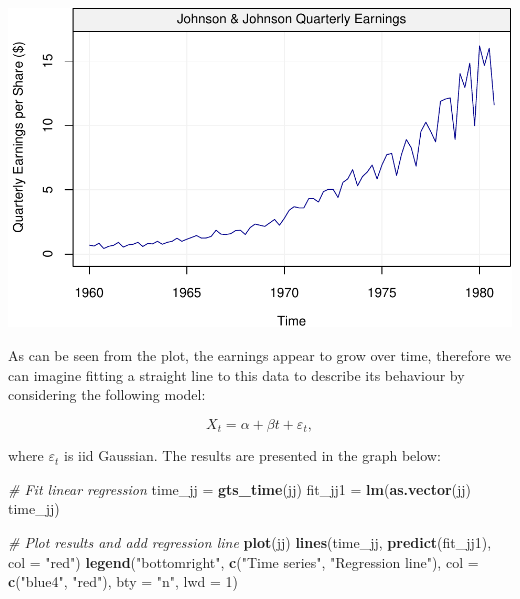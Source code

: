 \documentclass[]{book}
\newenvironment{Shaded}{\begin{snugshade}}{\end{snugshade}}
\newcommand{\KeywordTok}[1]{\textcolor[rgb]{0.13,0.29,0.53}{\textbf{#1}}}
\newcommand{\DataTypeTok}[1]{\textcolor[rgb]{0.13,0.29,0.53}{#1}}
\newcommand{\DecValTok}[1]{\textcolor[rgb]{0.00,0.00,0.81}{#1}}
\newcommand{\StringTok}[1]{\textcolor[rgb]{0.31,0.60,0.02}{#1}}
\newcommand{\CommentTok}[1]{\textcolor[rgb]{0.56,0.35,0.01}{\textit{#1}}}
\newcommand{\OperatorTok}[1]{\textcolor[rgb]{0.81,0.36,0.00}{\textbf{#1}}}
\newcommand{\NormalTok}[1]{#1}
\theoremstyle{definition}
\theoremstyle{definition}
\theoremstyle{definition}
\theoremstyle{remark}
\begin{document}
\begin{center}\includegraphics{ts_files/figure-latex/jjexample-1} \end{center}

As can be seen from the plot, the earnings appear to grow over time,
therefore we can imagine fitting a straight line to this data to
describe its behaviour by considering the following model:

\begin{equation} 
X_t = \alpha + \beta t + \varepsilon_t,
\label{eq:modeljjexample}
\end{equation}

where \(\varepsilon_t\) is iid Gaussian. The results are presented in
the graph below:

\begin{Shaded}
\begin{Highlighting}[]
\CommentTok{# Fit linear regression}
\NormalTok{time_jj =}\StringTok{ }\KeywordTok{gts_time}\NormalTok{(jj)}
\NormalTok{fit_jj1 =}\StringTok{ }\KeywordTok{lm}\NormalTok{(}\KeywordTok{as.vector}\NormalTok{(jj) }\OperatorTok{~}\StringTok{ }\NormalTok{time_jj)}

\CommentTok{# Plot results and add regression line}
\KeywordTok{plot}\NormalTok{(jj)}
\KeywordTok{lines}\NormalTok{(time_jj, }\KeywordTok{predict}\NormalTok{(fit_jj1), }\DataTypeTok{col =} \StringTok{"red"}\NormalTok{)}
\KeywordTok{legend}\NormalTok{(}\StringTok{"bottomright"}\NormalTok{, }\KeywordTok{c}\NormalTok{(}\StringTok{"Time series"}\NormalTok{, }\StringTok{"Regression line"}\NormalTok{), }
       \DataTypeTok{col =} \KeywordTok{c}\NormalTok{(}\StringTok{"blue4"}\NormalTok{, }\StringTok{"red"}\NormalTok{), }\DataTypeTok{bty =} \StringTok{"n"}\NormalTok{, }\DataTypeTok{lwd =} \DecValTok{1}\NormalTok{)}
\end{Highlighting}
\end{Shaded}
\end{document}
